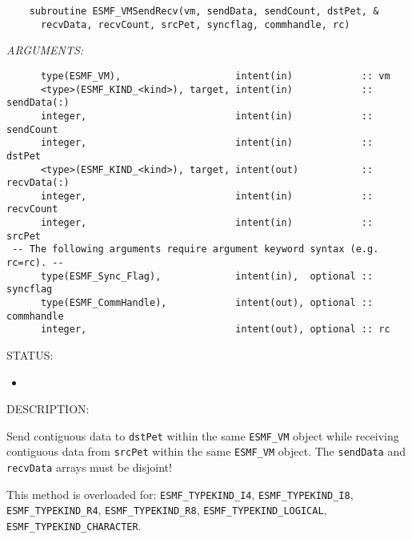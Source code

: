   
\begin{verbatim}    subroutine ESMF_VMSendRecv(vm, sendData, sendCount, dstPet, &
      recvData, recvCount, srcPet, syncflag, commhandle, rc)\end{verbatim}{\em ARGUMENTS:}
\begin{verbatim}      type(ESMF_VM),                    intent(in)            :: vm
      <type>(ESMF_KIND_<kind>), target, intent(in)            :: sendData(:)  
      integer,                          intent(in)            :: sendCount
      integer,                          intent(in)            :: dstPet
      <type>(ESMF_KIND_<kind>), target, intent(out)           :: recvData(:)  
      integer,                          intent(in)            :: recvCount
      integer,                          intent(in)            :: srcPet
 -- The following arguments require argument keyword syntax (e.g. rc=rc). --
      type(ESMF_Sync_Flag),             intent(in),  optional :: syncflag
      type(ESMF_CommHandle),            intent(out), optional :: commhandle
      integer,                          intent(out), optional :: rc           \end{verbatim}
{\sf STATUS:}
   \begin{itemize}
   \item{}
   \end{itemize}
  
{\sf DESCRIPTION:\\ }


     Send contiguous data to {\tt dstPet} within the same {\tt ESMF\_VM} object
     while receiving contiguous data from {\tt srcPet} within the same 
     {\tt ESMF\_VM} object. The {\tt sendData} and {\tt recvData} arrays must be
     disjoint!
  
     This method is overloaded for:
     {\tt ESMF\_TYPEKIND\_I4}, {\tt ESMF\_TYPEKIND\_I8},
     {\tt ESMF\_TYPEKIND\_R4}, {\tt ESMF\_TYPEKIND\_R8},
     {\tt ESMF\_TYPEKIND\_LOGICAL}, 
     {\tt ESMF\_TYPEKIND\_CHARACTER}.
  
